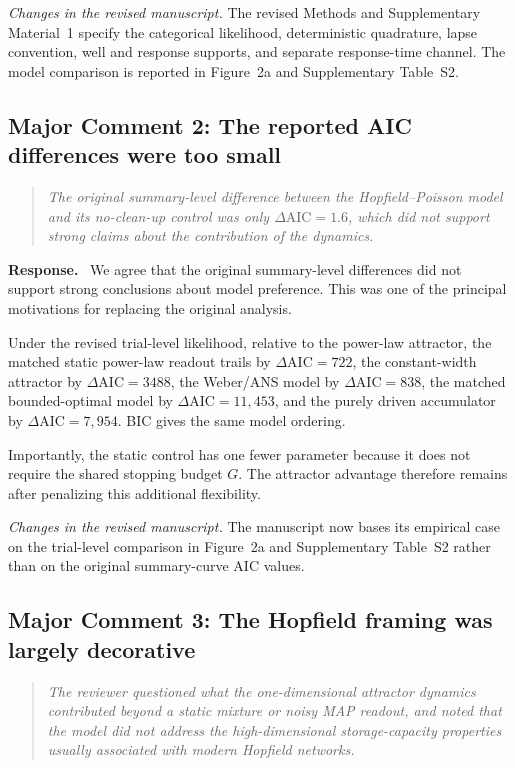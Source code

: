 \documentclass[11pt]{article}
\newenvironment{reviewercomment}{\begin{quote}\color{reviewgray}\itshape}{\end{quote}}
\newenvironment{authorresponse}{\par\noindent\textbf{\color{responseblue}Response.}\ }{\par}
\newcommand{\change}[1]{\par\noindent\textit{Changes in the revised manuscript.} #1\par}
\begin{document}
\change{The revised Methods and Supplementary Material~1 specify the categorical likelihood, deterministic quadrature, lapse convention, well and response supports, and separate response-time channel. The model comparison is reported in Figure~2a and Supplementary Table~S2.}

\subsection*{Major Comment 2: The reported AIC differences were too small}

\begin{reviewercomment}
The original summary-level difference between the Hopfield--Poisson model and its no-clean-up control was only $\Delta\mathrm{AIC}=1.6$, which did not support strong claims about the contribution of the dynamics.
\end{reviewercomment}

\begin{authorresponse}
We agree that the original summary-level differences did not support strong conclusions about model preference. This was one of the principal motivations for replacing the original analysis.

Under the revised trial-level likelihood, relative to the power-law attractor, the matched static power-law readout trails by $\Delta\mathrm{AIC}=722$, the constant-width attractor by $\Delta\mathrm{AIC}=3488$, the Weber/ANS model by $\Delta\mathrm{AIC}=838$, the matched bounded-optimal model by $\Delta\mathrm{AIC}=11{,}453$, and the purely driven accumulator by $\Delta\mathrm{AIC}=7{,}954$. BIC gives the same model ordering.

Importantly, the static control has one fewer parameter because it does not require the shared stopping budget $G$. The attractor advantage therefore remains after penalizing this additional flexibility.
\end{authorresponse}

\change{The manuscript now bases its empirical case on the trial-level comparison in Figure~2a and Supplementary Table~S2 rather than on the original summary-curve AIC values.}

\subsection*{Major Comment 3: The Hopfield framing was largely decorative}

\begin{reviewercomment}
The reviewer questioned what the one-dimensional attractor dynamics contributed beyond a static mixture or noisy MAP readout, and noted that the model did not address the high-dimensional storage-capacity properties usually associated with modern Hopfield networks.
\end{reviewercomment}
\end{document}
